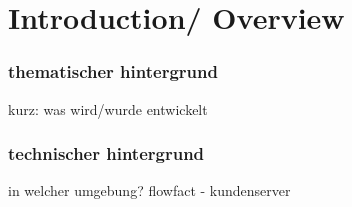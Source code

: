 \part{Introduction/ Overview}
\label{part:introduction}

\section{thematischer hintergrund}
kurz: was wird/wurde entwickelt

\section{technischer hintergrund}
in welcher umgebung? flowfact - kundenserver